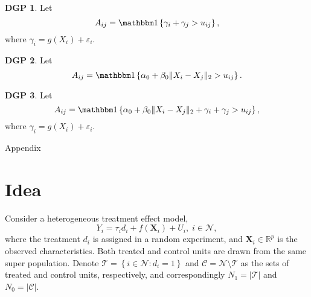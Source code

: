 \noindent \textbf{DGP 1}. Let 
\begin{equation}
    A_{ij} = \I  \left\{  \gamma _{i} + \gamma _{j} > u_{ij}  \right\}, 
\end{equation}
where \(\gamma _{i} = g \left( X_i \right) + \varepsilon _{i} \). 

\noindent \textbf{DGP 2}. Let 
\begin{equation}
    A_{ij} = \I  \left\{ \alpha_{0} + \beta _{0} \lVert X _{i} - X _{j}  \rVert_2 > u_{ij}  \right\}.
\end{equation}

\noindent \textbf{DGP 3}. Let 
\begin{equation}
    A_{ij} = \I  \left\{ \alpha_{0} + \beta _{0} \lVert X _{i} - X _{j}  \rVert_2 + \gamma _{i} + \gamma _{j} > u_{ij}  \right\}, 
\end{equation}
where \(\gamma _{i} = g \left( X_i \right) + \varepsilon _{i} \). 


\newpage



\newpage
\appendix

\begin{center}
{\huge Appendix}
\end{center}

\setcounter{table}{0} \renewcommand{\thetable}{A.\arabic{table}} %
\setcounter{section}{0} \renewcommand{\thesection}{A.\arabic{section}} %
\setcounter{figure}{0} \renewcommand{\thefigure}{A.\arabic{figure}}

\section{Idea}

Consider a heterogeneous treatment effect model,
\begin{equation}
    Y_{i}  = \tau _{i}  d_{i} + f\left( \bm{X} _i \right) + U_i,\;  i \in \mathcal{N},
\end{equation}
where the treatment \(d_i\) is assigned in a random experiment, and \(\bm{X} _{i} \in \mathbb{R}^{p} \) is the observed characteristics. Both treated and control units are drawn from the same super population.
Denote 
\(\mathcal{T} =\left\{ i \in \mathcal{N} : d _{i} = 1 \right\} \) and
\(\mathcal{C} = \mathcal{N} \setminus \mathcal{T} \) 
as the sets of treated and control units, respectively, and correspondingly \(N_{1} = \vert \mathcal{T}  \vert \) and \(N_{0} = \vert \mathcal{C}  \vert \).

